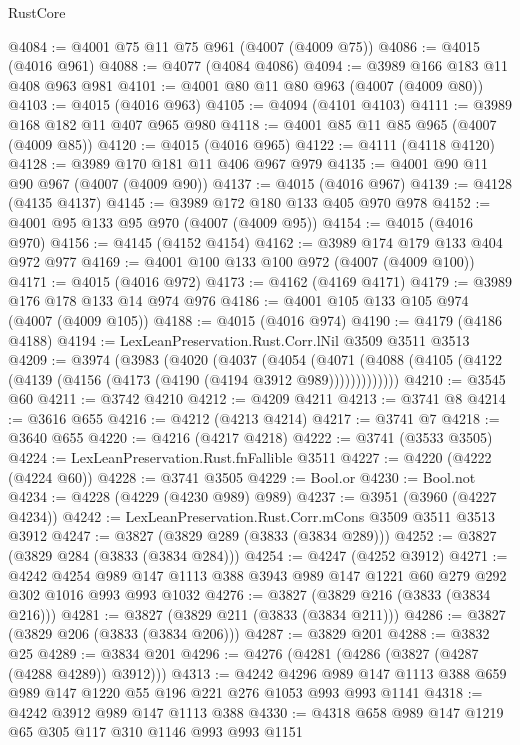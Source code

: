 \begin{lexlean}{RustCore}
\begin{coremodule}
@4084 := @4001 @75 @11 @75 @961 (@4007 (@4009 @75))
@4086 := @4015 (@4016 @961)
@4088 := @4077 (@4084 @4086)
@4094 := @3989 @166 @183 @11 @408 @963 @981
@4101 := @4001 @80 @11 @80 @963 (@4007 (@4009 @80))
@4103 := @4015 (@4016 @963)
@4105 := @4094 (@4101 @4103)
@4111 := @3989 @168 @182 @11 @407 @965 @980
@4118 := @4001 @85 @11 @85 @965 (@4007 (@4009 @85))
@4120 := @4015 (@4016 @965)
@4122 := @4111 (@4118 @4120)
@4128 := @3989 @170 @181 @11 @406 @967 @979
@4135 := @4001 @90 @11 @90 @967 (@4007 (@4009 @90))
@4137 := @4015 (@4016 @967)
@4139 := @4128 (@4135 @4137)
@4145 := @3989 @172 @180 @133 @405 @970 @978
@4152 := @4001 @95 @133 @95 @970 (@4007 (@4009 @95))
@4154 := @4015 (@4016 @970)
@4156 := @4145 (@4152 @4154)
@4162 := @3989 @174 @179 @133 @404 @972 @977
@4169 := @4001 @100 @133 @100 @972 (@4007 (@4009 @100))
@4171 := @4015 (@4016 @972)
@4173 := @4162 (@4169 @4171)
@4179 := @3989 @176 @178 @133 @14 @974 @976
@4186 := @4001 @105 @133 @105 @974 (@4007 (@4009 @105))
@4188 := @4015 (@4016 @974)
@4190 := @4179 (@4186 @4188)
@4194 := LexLeanPreservation.Rust.Corr.lNil @3509 @3511 @3513
@4209 := @3974
    (@3983
      (@4020
        (@4037
          (@4054
            (@4071 (@4088 (@4105 (@4122 (@4139 (@4156 (@4173 (@4190 (@4194 @3912 @989)))))))))))))
@4210 := @3545 @60
@4211 := @3742 @4210
@4212 := @4209 @4211
@4213 := @3741 @8
@4214 := @3616 @655
@4216 := @4212 (@4213 @4214)
@4217 := @3741 @7
@4218 := @3640 @655
@4220 := @4216 (@4217 @4218)
@4222 := @3741 (@3533 @3505)
@4224 := LexLeanPreservation.Rust.fnFallible @3511
@4227 := @4220 (@4222 (@4224 @60))
@4228 := @3741 @3505
@4229 := Bool.or
@4230 := Bool.not
@4234 := @4228 (@4229 (@4230 @989) @989)
@4237 := @3951 (@3960 (@4227 @4234))
@4242 := LexLeanPreservation.Rust.Corr.mCons @3509 @3511 @3513 @3912
@4247 := @3827 (@3829 @289 (@3833 (@3834 @289)))
@4252 := @3827 (@3829 @284 (@3833 (@3834 @284)))
@4254 := @4247 (@4252 @3912)
@4271 := @4242
    @4254
    @989
    @147
    @1113
    @388
    @3943
    @989
    @147
    @1221
    @60
    @279
    @292
    @302
    @1016
    @993
    @993
    @1032
@4276 := @3827 (@3829 @216 (@3833 (@3834 @216)))
@4281 := @3827 (@3829 @211 (@3833 (@3834 @211)))
@4286 := @3827 (@3829 @206 (@3833 (@3834 @206)))
@4287 := @3829 @201
@4288 := @3832 @25
@4289 := @3834 @201
@4296 := @4276 (@4281 (@4286 (@3827 (@4287 (@4288 @4289)) @3912)))
@4313 := @4242
    @4296
    @989
    @147
    @1113
    @388
    @659
    @989
    @147
    @1220
    @55
    @196
    @221
    @276
    @1053
    @993
    @993
    @1141
@4318 := @4242 @3912 @989 @147 @1113 @388
@4330 := @4318 @658 @989 @147 @1219 @65 @305 @117 @310 @1146 @993 @993 @1151

\end{coremodule}
\end{lexlean}
